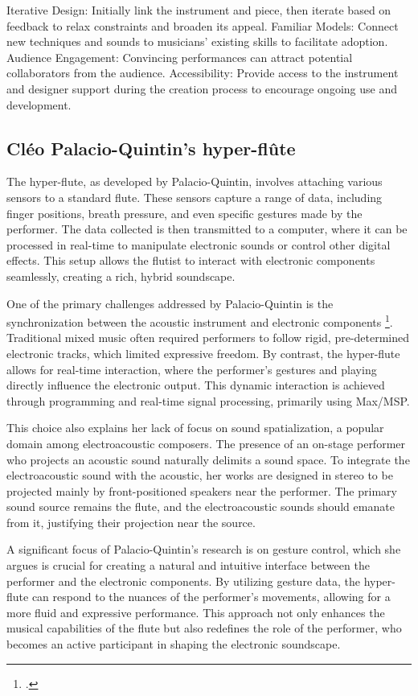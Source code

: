 \documentclass[12pt,twoside,maitrise]{dms_ks}
\theoremstyle{definition}
\begin{document}
Iterative Design: Initially link the instrument and piece, then iterate based on feedback to relax constraints and broaden its appeal.
Familiar Models: Connect new techniques and sounds to musicians' existing skills to facilitate adoption.
Audience Engagement: Convincing performances can attract potential collaborators from the audience.
Accessibility: Provide access to the instrument and designer support during the creation process to encourage ongoing use and development.

\subsection{Cléo Palacio-Quintin's hyper-flûte}

The hyper-flute, as developed by Palacio-Quintin, involves attaching various sensors to a standard flute. 
These sensors capture a range of data, including finger positions, breath pressure, and even specific gestures made by the performer. 
The data collected is then transmitted to a computer, where it can be processed in real-time to manipulate electronic sounds or control other digital effects. 
This setup allows the flutist to interact with electronic components seamlessly, creating a rich, hybrid soundscape.

One of the primary challenges addressed by Palacio-Quintin is the synchronization between the acoustic instrument and electronic components \footcite{palacio-quintin_composition_2012-1}. 
Traditional mixed music often required performers to follow rigid, pre-determined electronic tracks, which limited expressive freedom. 
By contrast, the hyper-flute allows for real-time interaction, where the performer's gestures and playing directly influence the electronic output. 
This dynamic interaction is achieved through programming and real-time signal processing, primarily using Max/MSP.

This choice also explains her lack of focus on sound spatialization, a popular domain among electroacoustic composers. 
The presence of an on-stage performer who projects an acoustic sound naturally delimits a sound space. 
To integrate the electroacoustic sound with the acoustic, her works are designed in stereo to be projected mainly by front-positioned speakers near the performer. 
The primary sound source remains the flute, and the electroacoustic sounds should emanate from it, justifying their projection near the source.

A significant focus of Palacio-Quintin's research is on gesture control, which she argues is crucial for creating a natural and intuitive interface between the performer and the electronic components. 
By utilizing gesture data, the hyper-flute can respond to the nuances of the performer's movements, allowing for a more fluid and expressive performance. 
This approach not only enhances the musical capabilities of the flute but also redefines the role of the performer, who becomes an active participant in shaping the electronic soundscape.
\end{document}
